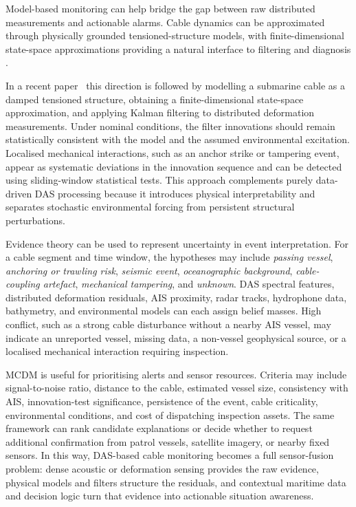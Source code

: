 \documentclass[11pt,oneside,openany]{book}
\begin{document}
Model-based monitoring can help bridge the gap between raw distributed measurements and actionable alarms. Cable dynamics can be approximated through physically grounded tensioned-structure models, with finite-dimensional state-space approximations providing a natural interface to filtering and diagnosis \cite{irvine_linear_1974,baudouin_cable_pde_2018}. 

In a recent paper~\cite{fioravanti_cable_med_2026} this direction is followed by modelling a submarine cable as a damped tensioned structure, obtaining a finite-dimensional state-space approximation, and applying Kalman filtering to distributed deformation measurements. Under nominal conditions, the filter innovations should remain statistically consistent with the model and the assumed environmental excitation. Localised mechanical interactions, such as an anchor strike or tampering event, appear as systematic deviations in the innovation sequence and can be detected using sliding-window statistical tests. This approach complements purely data-driven DAS processing because it introduces physical interpretability and separates stochastic environmental forcing from persistent structural perturbations.

Evidence theory can be used to represent uncertainty in event interpretation. For a cable segment and time window, the hypotheses may include \emph{passing vessel}, \emph{anchoring or trawling risk}, \emph{seismic event}, \emph{oceanographic background}, \emph{cable-coupling artefact}, \emph{mechanical tampering}, and \emph{unknown}. DAS spectral features, distributed deformation residuals, AIS proximity, radar tracks, hydrophone data, bathymetry, and environmental models can each assign belief masses. High conflict, such as a strong cable disturbance without a nearby AIS vessel, may indicate an unreported vessel, missing data, a non-vessel geophysical source, or a localised mechanical interaction requiring inspection.

MCDM is useful for prioritising alerts and sensor resources. Criteria may include signal-to-noise ratio, distance to the cable, estimated vessel size, consistency with AIS, innovation-test significance, persistence of the event, cable criticality, environmental conditions, and cost of dispatching inspection assets. The same framework can rank candidate explanations or decide whether to request additional confirmation from patrol vessels, satellite imagery, or nearby fixed sensors. In this way, DAS-based cable monitoring becomes a full sensor-fusion problem: dense acoustic or deformation sensing provides the raw evidence, physical models and filters structure the residuals, and contextual maritime data and decision logic turn that evidence into actionable situation awareness.
\end{document}
